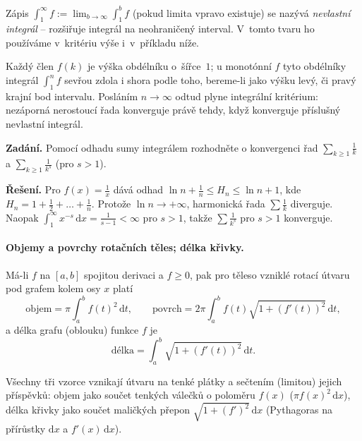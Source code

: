 \documentclass[11pt,a4paper]{article}
\begin{document}
\begin{poznamka}
Zápis $\int_1^\infty f:=\lim_{b\to\infty}\int_1^b f$ (pokud limita vpravo existuje) se nazývá \emph{nevlastní integrál} -- rozšiřuje integrál na neohraničený interval. V~tomto tvaru ho používáme v~kritériu výše i~v~příkladu níže.
\end{poznamka}

\begin{intuice}
Každý člen $f(k)$ je výška obdélníku o~šířce~$1$; u monotónní $f$ tyto obdélníky integrál $\int_1^n f$ sevřou zdola i shora podle toho, bereme-li jako výšku levý, či pravý krajní bod intervalu. Posláním $n\to\infty$ odtud plyne integrální kritérium: nezáporná nerostoucí řada konverguje právě tehdy, když konverguje příslušný nevlastní integrál.
\end{intuice}

\begin{priklad}
\textbf{Zadání.} Pomocí odhadu sumy integrálem rozhodněte o konvergenci řad $\sum_{k\ge1}\tfrac1k$ a $\sum_{k\ge1}\tfrac1{k^s}$ (pro $s>1$).\par
\textbf{Řešení.} Pro $f(x)=\tfrac1x$ dává odhad $\ln n+\tfrac1n\le H_n\le \ln n+1$, kde $H_n=1+\tfrac12+\dots+\tfrac1n$. Protože $\ln n\to+\infty$, harmonická řada $\sum\tfrac1k$ diverguje. Naopak $\int_1^\infty x^{-s}\,\mathrm{d}x=\tfrac1{s-1}<\infty$ pro $s>1$, takže $\sum\tfrac1{k^s}$ pro $s>1$ konverguje.
\end{priklad}

\paragraph{Objemy a povrchy rotačních těles; délka křivky.} Má-li $f$ na $[a,b]$ spojitou derivaci a $f\ge0$, pak pro těleso vzniklé rotací útvaru pod grafem kolem osy $x$ platí
\[
  \text{objem}=\pi\int_a^b f(t)^2\,\mathrm{d}t,\qquad
  \text{povrch}=2\pi\int_a^b f(t)\sqrt{1+(f'(t))^2}\,\mathrm{d}t,
\]
a délka grafu (oblouku) funkce $f$ je
\[
  \text{délka}=\int_a^b \sqrt{1+(f'(t))^2}\,\mathrm{d}t.
\]

\begin{intuice}
Všechny tři vzorce vznikají  útvaru na tenké plátky a sečtením (limitou) jejich příspěvků: objem jako součet tenkých válečků o poloměru $f(x)$ ($\pi f(x)^2\,\mathrm{d}x$), délka křivky jako součet maličkých přepon $\sqrt{1+(f')^2}\,\mathrm{d}x$ (Pythagoras na přírůstky $\mathrm{d}x$ a $f'(x)\,\mathrm{d}x$).
\end{intuice}
\end{document}
